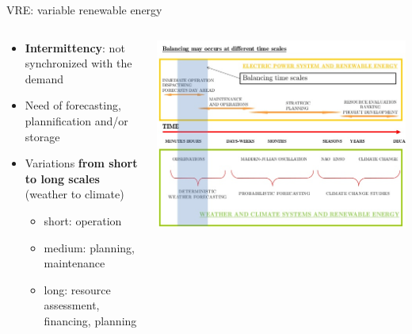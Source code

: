 \documentclass{beamer}%
\begin{document}
\begin{frame}{VRE: variable renewable energy}
\begin{columns}
  \begin{column}{0.55\textwidth}
\small{\begin{itemize}
 \item<2-> \textbf{\alert{Intermittency}}: not synchronized with the demand
  \item<3-> Need of forecasting, plannification and/or storage
  \item<4-> Variations \textbf{from short to long scales}\\ (weather to climate)
    \begin{itemize}
    \item \alert{short}: operation
    \item \alert{medium}: planning, maintenance
    \item \alert{long}: resource assessment, financing, planning
  \end{itemize}    
\end{itemize}}
\end{column}
\begin{column}{0.6\textwidth}
  \centering\includegraphics[width=1\textwidth]{timescales.jpg}
\end{column}
\end{columns}
\end{frame}
\end{document}
